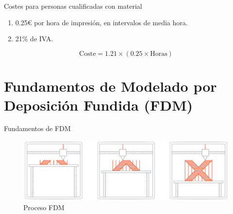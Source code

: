\documentclass{beamer}
\begin{document}
	\begin{frame}{Costes para personas cualificadas con material}
		\begin{enumerate}
			\item 0.25€ por hora de impresión, en intervalos de media hora.
			\item 21\% de IVA.
		\end{enumerate}
		$$\text{Coste}=1.21\times \left( 0.25\times\text{Horas} \right)$$
	\end{frame}
	
	\section{Fundamentos de Modelado por Deposición Fundida (FDM)}
	\begin{frame}{Fundamentos de FDM}
		\begin{figure}
			\includegraphics[width=\textwidth]{images/fdm}
			\caption{Proceso FDM}
		\end{figure}
	\end{frame}
	
\end{document}
